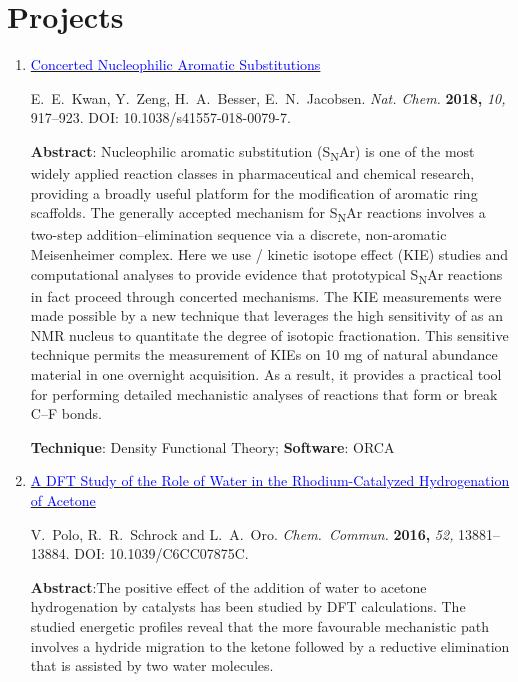 \documentclass[10pt]{article}
\begin{document}
\section*{Projects}


\begin{enumerate}
    \item \href{https://doi.org/10.1038/s41557-018-0079-7}{\textcolor{blue}{Concerted Nucleophilic Aromatic Substitutions}}

        E.\ E.\ Kwan, Y.\ Zeng, H.\ A.\ Besser, E.\ N.\ Jacobsen. \textit{Nat. Chem.} \textbf{2018,} \textit{10,} 917--923. DOI: 10.1038/s41557-018-0079-7.
 
          \textbf{Abstract}: Nucleophilic aromatic substitution (S\textsubscript{N}Ar) is one of the most widely applied reaction classes in pharmaceutical and chemical research, providing a broadly useful platform for the modification of aromatic ring scaffolds. The generally accepted mechanism for S\textsubscript{N}Ar reactions involves a two-step addition--elimination sequence via a discrete, non-aromatic Meisenheimer complex. Here we use / kinetic isotope effect (KIE) studies and computational analyses to provide evidence that prototypical S\textsubscript{N}Ar reactions in fact proceed through concerted mechanisms. The KIE measurements were made possible by a new technique that leverages the high sensitivity of  as an NMR nucleus to quantitate the degree of isotopic fractionation. This sensitive technique permits the measurement of KIEs on 10 mg of natural abundance material in one overnight acquisition. As a result, it provides a practical tool for performing detailed mechanistic analyses of reactions that form or break C--F bonds.

          \textbf{Technique}: Density Functional Theory; \textbf{Software}: {ORCA}

          \vspace{0.5cm}

    \item \href{https://doi.org/10.1039/C6CC07875C}{\textcolor{blue}{A DFT Study of the Role of Water in the Rhodium-Catalyzed Hydrogenation of Acetone}}

        V.\ Polo, R.\ R.\ Schrock and L.\ A.\ Oro. \textit{Chem.\ Commun.} \textbf{2016,} \textit{52,} 13881--13884. DOI: 10.1039/C6CC07875C.
 
          \textbf{Abstract}:The positive effect of the addition of water to acetone hydrogenation by \ce{[RhH2(PR3)2S2]+} catalysts has been studied by DFT calculations. The studied energetic profiles reveal that the more favourable mechanistic path involves a hydride migration to the ketone followed by a reductive elimination that is assisted by two water molecules.


\end{enumerate}
\end{document}
